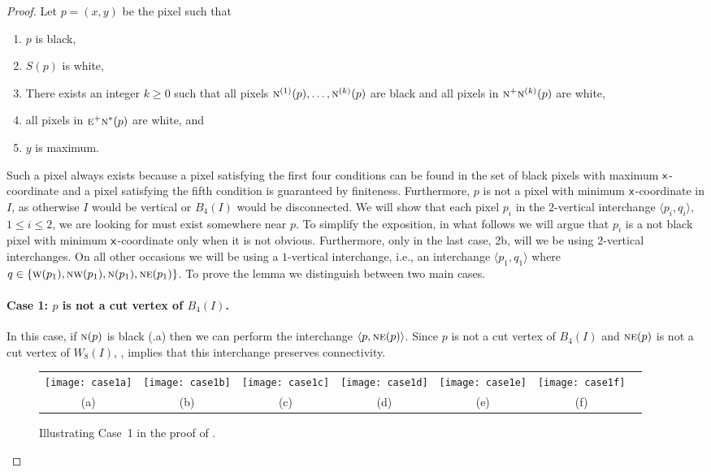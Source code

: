 \documentclass[lotsofwhite,charterfonts]{patmorin}
\newcommand{\N}{\textsc{n}}
\newcommand{\NE}{\textsc{ne}}
\newcommand{\E}{\textsc{e}}
\newcommand{\W}{\textsc{w}}
\newcommand{\NW}{\textsc{nw}}
\newcommand{\x}{\ensuremath{\protect\textup{\textsf{x}}}}
\newcommand{\ic}[2]{\langle #1,#2 \rangle}
\begin{document}
\begin{proof}
Let $p=(x,y)$ be the pixel such that
\begin{enumerate}
  \item $p$ is black, 
  \item $S(p)$ is white,
  \item There exists an integer $k\ge 0$ such that all pixels
	$\N^{(1)}(p),\ldots,\N^{(k)}(p)$ are black and 
        all pixels in $\N^{+}\N^{(k)}(p)$ are white,
  \item all pixels in $\E^+\N^*(p)$ are white, and
  \item $y$ is maximum.
\end{enumerate}
Such a pixel always exists because a pixel satisfying the first four
conditions can be found in the set of black pixels with maximum
\x-coordinate and a pixel satisfying the fifth condition is guaranteed
by finiteness. Furthermore, $p$ is not a pixel with minimum
\x-coordinate in $I$, as otherwise $I$ would be vertical or $B_4(I)$
would be disconnected. We will show that each pixel $p_i$ in the
$2$-vertical interchange $\ic{p_i}{q_i}$,$1\leq i\leq 2$,  we are
looking for must exist somewhere near $p$. To simplify the exposition,
in what follows we will argue that $p_i$ is a not black pixel with
minimum \x-coordinate only when it is not obvious. Furthermore, only
in the last case, 2b, will we be using $2$-vertical
interchanges. On all other occasions we will be using a $1$-vertical
interchange, i.e., an interchange $\ic{p_1}{q_1}$ where
$q\in\{\W(p_1),\NW(p_1),\N(p_1),\NE(p_1)\}$. To prove the lemma we
distinguish between two main cases.


\paragraph{Case 1: $p$ is not a cut vertex of $B_4(I)$.}  In this
case, if $\N(p)$ is black (.a) then we can perform
the interchange $\ic{p}{\NE(p)}$.  Since $p$ is not a cut vertex of
$B_4(I)$ and $\NE(p)$ is not a cut vertex of $W_8(I)$,
, implies that this interchange preserves
connectivity.

\begin{figure}[htbp]
\begin{center}
\begin{tabular}{ccccccc}
\texttt{[image: case1a]} & 
\texttt{[image: case1b]} & 
\texttt{[image: case1c]} & 
\texttt{[image: case1d]} & 
\texttt{[image: case1e]} & 
\texttt{[image: case1f]} \\
(a) & (b) & (c) & (d) & (e) & (f)
\end{tabular}
\end{center}
\caption{Illustrating Case~1 in the proof of .}
\end{figure}



\end{proof}
\end{document}
